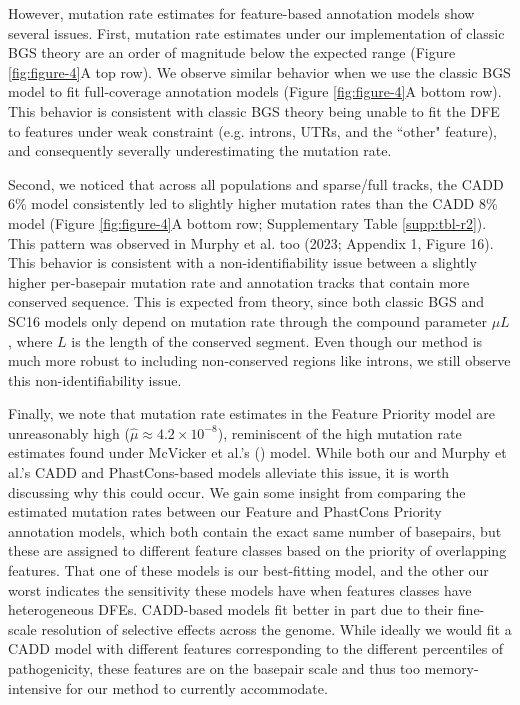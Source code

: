 \documentclass[11pt]{article}
\begin{document}
However, mutation rate estimates for feature-based annotation models show
several issues. First, mutation rate estimates under our implementation of
classic BGS theory are an order of magnitude below the expected range (Figure
\ref{fig:figure-4}A top row). We observe similar behavior when we use the
classic BGS model to fit full-coverage annotation models (Figure
\ref{fig:figure-4}A bottom row). This behavior is consistent with classic BGS
theory being unable to fit the DFE to features under weak constraint (e.g.
introns, UTRs, and the ``other" feature), and consequently severally
underestimating the mutation rate. 

Second, we noticed that across all populations and sparse/full tracks, the CADD
6\% model consistently led to slightly higher mutation rates than the CADD 8\%
model (Figure \ref{fig:figure-4}A bottom row; Supplementary Table
\ref{supp:tbl-r2}). This pattern was observed in Murphy et al. too (2023;
Appendix 1, Figure 16). This behavior is consistent with a non-identifiability
issue between a slightly higher per-basepair mutation rate and annotation
tracks that contain more conserved sequence. This is expected from theory,
since both classic BGS and SC16 models only depend on mutation rate through the
compound parameter $\mu L$, where $L$ is the length of the conserved segment.
Even though our method is much more robust to including non-conserved regions
like introns, we still observe this non-identifiability issue.

Finally, we note that mutation rate estimates in the Feature Priority model are
unreasonably high ($\widehat{\mu} \approx 4.2 \times 10^{-8}$), reminiscent of
the high mutation rate estimates found under McVicker et al.'s
(\citeyear{McVicker2009-ax}) model. While both our and Murphy et al.'s CADD and
PhastCons-based models alleviate this issue, it is worth discussing why this
could occur. We gain some insight from comparing the estimated mutation rates
between our Feature and PhastCons Priority annotation models, which both
contain the exact same number of basepairs, but these are assigned to different
feature classes based on the priority of overlapping features. That one of
these models is our best-fitting model, and the other our worst indicates the
sensitivity these models have when features classes have heterogeneous DFEs.
CADD-based models fit better in part due to their fine-scale resolution of
selective effects across the genome. While ideally we would fit a CADD model
with different features corresponding to the different percentiles of
pathogenicity, these features are on the basepair scale and thus too
memory-intensive for our method to currently accommodate.
\end{document}
